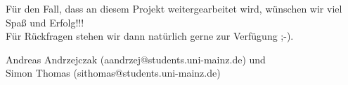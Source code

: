 \documentclass[11pt,a4paper,titlepage]{article}
\theoremstyle{plain} %
\theoremstyle{definition} %
\numberwithin{equation}{section} %
\begin{document}
		\vspace*{2cm}
		
		Für den Fall, dass an diesem Projekt weitergearbeitet wird, wünschen wir viel Spaß und Erfolg!!!\\
		Für Rückfragen stehen wir dann natürlich gerne zur Verfügung ;-).\\
		\vspace*{0.5cm}
		
		Andreas Andrzejczak (aandrzej@students.uni-mainz.de) und\\
		Simon Thomas (sithomas@students.uni-mainz.de)
				
		\newpage		
		
		\vspace{0.5cm}
\end{document}

